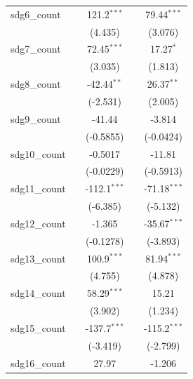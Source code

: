\begin{tabular}{lcccc}
   sdg6\_count       &                & 121.2$^{***}$  &                & 79.44$^{***}$\\   
                     &                & (4.435)        &                & (3.076)\\   
   sdg7\_count       &                & 72.45$^{***}$  &                & 17.27$^{*}$\\   
                     &                & (3.035)        &                & (1.813)\\   
   sdg8\_count       &                & -42.44$^{**}$  &                & 26.37$^{**}$\\   
                     &                & (-2.531)       &                & (2.005)\\   
   sdg9\_count       &                & -41.44         &                & -3.814\\   
                     &                & (-0.5855)      &                & (-0.0424)\\   
   sdg10\_count      &                & -0.5017        &                & -11.81\\   
                     &                & (-0.0229)      &                & (-0.5913)\\   
   sdg11\_count      &                & -112.1$^{***}$ &                & -71.18$^{***}$\\   
                     &                & (-6.385)       &                & (-5.132)\\   
   sdg12\_count      &                & -1.365         &                & -35.67$^{***}$\\   
                     &                & (-0.1278)      &                & (-3.893)\\   
   sdg13\_count      &                & 100.9$^{***}$  &                & 81.94$^{***}$\\   
                     &                & (4.755)        &                & (4.878)\\   
   sdg14\_count      &                & 58.29$^{***}$  &                & 15.21\\   
                     &                & (3.902)        &                & (1.234)\\   
   sdg15\_count      &                & -137.7$^{***}$ &                & -115.2$^{***}$\\   
                     &                & (-3.419)       &                & (-2.799)\\   
   sdg16\_count      &                & 27.97          &                & -1.206\\   

\end{tabular}
